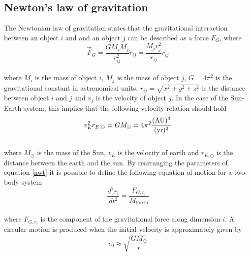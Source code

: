 \documentclass[%
reprint,nofootinbib,
amsmath,amssymb,
aps,
]{revtex4-1}
\begin{document}
\subsection{Newton's law of gravitation} \noindent 
The Newtonian law of gravitation states that the gravitational interaction between an object $i$ and and an object $j$ can be described as a force $F_G$, where \vspace{3mm}\\
\begin{equation}\label{nwt}
	\vec{F}_G = \frac{GM_iM_j}{r_{ij}^2}\hat{r}_{ij} = \frac{M_jv_j^2}{r_{ij}}\hat{r}_{ij}
\end{equation} \vspace{3mm} \\
where $M_i$ is the mass of object $i$, $M_j$ is the mass of object $j$, $G=4\pi^2$ is the gravitational constant in astronomical units, $r_{ij} = \sqrt{x^2+y^2+z^2}$ is the distance between object $i$ and $j$ and $v_j$ is the velocity of object $j$. In the case of the Sun-Earth system, this implies that the following velocity relation should hold\vspace{5mm} \\
\begin{equation}\label{motion1}
	v_{E}^2r_{E, \odot} = GM_{\odot} = 4\pi^2\dfrac{(\textnormal{AU})^3}{(\textnormal{yr})^2}
\end{equation}\vspace{5mm}\\
where $M_{\odot}$ is the mass of the Sun, $v_{E}$ is the velocity of earth and $r_{E,\odot}$ is the distance between the earth and the sun. By rearranging the parameters of equation \ref{nwt} it is possible to define the following equation of motion for a two-body system\vspace{3mm}\\ 
\begin{equation}\label{mot2}
	\dfrac{d^2r_i}{dt^2}=\dfrac{F_{G,r_i}}{M_{\mathrm{Earth}}}
\end{equation}\vspace{3mm} \\ 
where $F_{G,r_i}$ is the component of the gravitational force along dimension $i$.
A circular motion is produced when the initial velocity is approximately given by \vspace{3mm}\\
\begin{equation}\label{v0}
	v_0 \approx \sqrt{\dfrac{GM_\odot}{r}}
\end{equation} \newpage \noindent 
\end{document}

